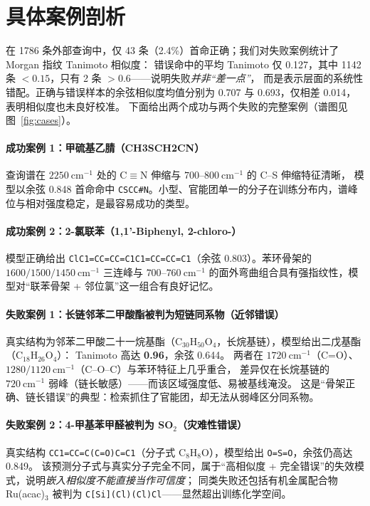 \documentclass[UTF8,a4paper,11pt]{ctexart}
\begin{document}
\section{具体案例剖析}

在 1786 条外部查询中，仅 43 条（2.4\%）首命正确；我们对失败案例统计了 Morgan 指纹 Tanimoto 相似度：
错误命中的平均 Tanimoto 仅 0.127，其中 1142 条 $<0.15$，只有 2 条 $>0.6$——说明失败\emph{并非“差一点”}，
而是表示层面的系统性错配。正确与错误样本的余弦相似度均值分别为 0.707 与 0.693，仅相差 0.014，表明相似度也未良好校准。
下面给出两个成功与两个失败的完整案例（谱图见图~\ref{fig:cases}）。

\paragraph{成功案例 1：甲硫基乙腈（CH3SCH2CN）}
查询谱在 $2250\ \mathrm{cm}^{-1}$ 处的 C$\equiv$N 伸缩与 $700$--$800\ \mathrm{cm}^{-1}$ 的 C--S 伸缩特征清晰，
模型以余弦 0.848 首命命中 \texttt{CSCC\#N}。小型、官能团单一的分子在训练分布内，谱峰位与相对强度稳定，是最容易成功的类型。

\paragraph{成功案例 2：2-氯联苯（1,1'-Biphenyl, 2-chloro-）}
模型正确给出 \texttt{ClC1=CC=CC=C1C1=CC=CC=C1}（余弦 0.803）。苯环骨架的 $1600/1500/1450\ \mathrm{cm}^{-1}$ 三连峰与
$700$--$760\ \mathrm{cm}^{-1}$ 的面外弯曲组合具有强指纹性，模型对“联苯骨架 + 邻位氯”这一组合有良好记忆。

\paragraph{失败案例 1：长链邻苯二甲酸酯被判为短链同系物（近邻错误）}
真实结构为邻苯二甲酸二十一烷基酯（C$_{30}$H$_{50}$O$_4$，长烷基链），模型给出二戊基酯（C$_{18}$H$_{26}$O$_4$）：
Tanimoto 高达 \textbf{0.96}，余弦 0.644。
两者在 $1720\ \mathrm{cm}^{-1}$（C=O）、$1280/1120\ \mathrm{cm}^{-1}$（C--O--C）与苯环特征上几乎重合，
差异仅在长烷基链的 $720\ \mathrm{cm}^{-1}$ 弱峰（链长敏感）——而该区域强度低、易被基线淹没。
这是“骨架正确、链长错误”的典型：检索抓住了官能团，却无法从弱峰区分同系物。

\paragraph{失败案例 2：4-甲基苯甲醛被判为 SO$_2$（灾难性错误）}
真实结构 \texttt{CC1=CC=C(C=O)C=C1}（分子式 C$_8$H$_8$O），模型给出 \texttt{O=S=O}，余弦仍高达 0.849。
该预测分子式与真实分子完全不同，属于“高相似度 + 完全错误”的失效模式，说明\emph{嵌入相似度不能直接当作可信度}；
同类失败还包括有机金属配合物 Ru(acac)$_3$ 被判为 \texttt{C[Si](Cl)(Cl)Cl}——显然超出训练化学空间。
\end{document}
